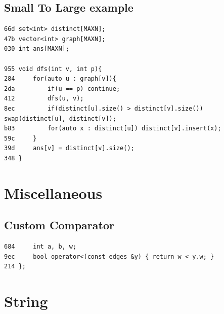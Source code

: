 \documentclass[11pt, a4paper, twoside]{article}
\begin{document}
\subsection{Small To Large example}
\begin{lstlisting}
66d set<int> distinct[MAXN];
47b vector<int> graph[MAXN];
030 int ans[MAXN];
 
955 void dfs(int v, int p){ 
284     for(auto u : graph[v]){
2da         if(u == p) continue;
412         dfs(u, v);
8ec         if(distinct[u].size() > distinct[v].size()) swap(distinct[u], distinct[v]);
b83         for(auto x : distinct[u]) distinct[v].insert(x);
59c     }
39d     ans[v] = distinct[v].size();
348 }
\end{lstlisting}



%
%

\section{Miscellaneous}

\subsection{Custom Comparator}
\begin{lstlisting}
684     int a, b, w;
9ec     bool operator<(const edges &y) { return w < y.w; }
214 };
\end{lstlisting}



%
%

\section{String}
\end{document}
